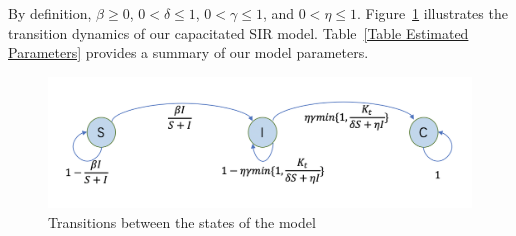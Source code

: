 \documentclass[nonblindrev, copyedit]{informs3a}
\begin{document}
By definition, $\beta\ge 0$, $0<\delta\le 1$, $0<\gamma\le 1$, and $0<\eta\le 1$. Figure~\ref{fig:transition} illustrates the transition dynamics of our capacitated SIR model. Table~\ref{Table Estimated Parameters} provides a summary of our model parameters.

\begin{figure}[ht]
	\centering
 	\caption{Transitions between the states of the model}
 	\label{fig:transition}
	\includegraphics[width=0.8\linewidth, angle=0]{transition_fig.png}
\end{figure}
\end{document}
